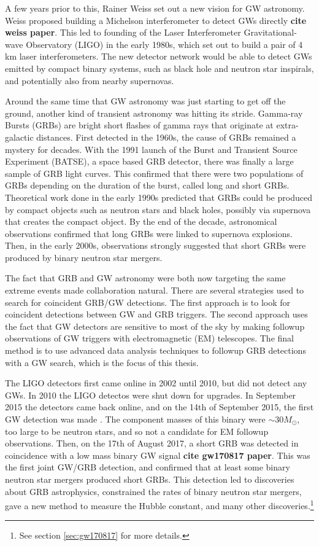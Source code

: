 \documentclass[11pt]{cuthesis}
\begin{document}
A few years prior to this, Rainer Weiss set out a new vision for GW astronomy. Weiss proposed building a Michelson interferometer to detect GWs directly \textbf{cite weiss paper}. This led to founding of the Laser Interferometer Gravitational-wave Observatory (LIGO) in the early 1980s, which set out to build a pair of 4 km laser interferometers. The new detector network would be able to detect GWs emitted by compact binary systems, such as black hole and neutron star inspirals, and potentially also from nearby supernovas. 

Around the same time that GW astronomy was just starting to get off the ground, another kind of transient astronomy was hitting its stride. Gamma-ray Bursts (GRBs) are bright short flashes of gamma rays that originate at extra-galactic distances. First detected in the 1960s, the cause of GRBs remained a mystery for decades. With the 1991 launch of the Burst and Transient Source Experiment (BATSE), a space based GRB detector, there was finally a large sample of GRB light curves. This confirmed that there were two populations of GRBs depending on the duration of the burst, called long and short GRBs. Theoretical work done in the early 1990s predicted that GRBs could be produced by compact objects such as neutron stars and black holes, possibly via supernova that creates the compact object. By the end of the decade, astronomical observations confirmed that long GRBs were linked to supernova explosions. Then, in the early 2000s, observations strongly suggested that short GRBs were produced by binary neutron star mergers. 

The fact that GRB and GW astronomy were both now targeting the same extreme events made collaboration natural. There are several strategies used to search for coincident GRB/GW detections. The first approach is to look for coincident detections between GW and GRB triggers. The second approach uses the fact that GW detectors are sensitive to most of the sky by making followup observations of GW triggers with electromagnetic (EM) telescopes. The final method is to use advanced data analysis techniques to followup GRB detections with a GW search, which is the focus of this thesis. 

The LIGO detectors first came online in 2002 until 2010, but did not detect any GWs. In 2010 the LIGO detectos were shut down for upgrades. In September 2015 the detectors came back online, and on the 14th of September 2015, the first GW detection was made \cite{150914-det-paper}. The component masses of this binary were $\sim 30M_\odot$, too large to be neutron stars, and so not a candidate for EM followup observations. Then, on the 17th of August 2017, a short GRB was detected in coincidence with a low mass binary GW signal \textbf{cite gw170817 paper}. This was the first joint GW/GRB detection, and confirmed that at least some binary neutron star mergers produced short GRBs. This detection led to discoveries about GRB astrophysics, constrained the rates of binary neutron star mergers, gave a new method to measure the Hubble constant, and many other discoveries.\footnote{See section \ref{sec:gw170817} for more details.}
\end{document}
